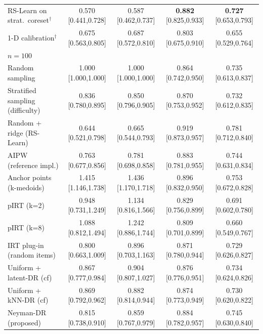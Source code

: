 \begin{tabular}{l cccc}
RS-Learn on strat.\ coreset$^\dagger$ & 0.570 {\scriptsize[0.441,0.728]} & 0.587 {\scriptsize[0.462,0.737]} & \textbf{0.882} {\scriptsize[0.825,0.933]} & \textbf{0.727} {\scriptsize[0.653,0.793]} \\
1-D calibration$^\dagger$ & 0.675 {\scriptsize[0.563,0.805]} & 0.687 {\scriptsize[0.572,0.810]} & 0.803 {\scriptsize[0.675,0.910]} & 0.655 {\scriptsize[0.529,0.764]} \\
\midrule
\multicolumn{5}{l}{\emph{$n=100$}}\\
Random sampling & 1.000 {\scriptsize[1.000,1.000]} & 1.000 {\scriptsize[1.000,1.000]} & 0.864 {\scriptsize[0.742,0.950]} & 0.735 {\scriptsize[0.613,0.837]} \\
Stratified sampling (difficulty) & 0.836 {\scriptsize[0.780,0.895]} & 0.850 {\scriptsize[0.796,0.905]} & 0.870 {\scriptsize[0.753,0.952]} & 0.732 {\scriptsize[0.612,0.835]} \\
Random + ridge (RS-Learn) & 0.644 {\scriptsize[0.521,0.798]} & 0.665 {\scriptsize[0.544,0.793]} & 0.919 {\scriptsize[0.873,0.957]} & 0.781 {\scriptsize[0.712,0.840]} \\
AIPW (reference impl.) & 0.763 {\scriptsize[0.677,0.856]} & 0.781 {\scriptsize[0.698,0.858]} & 0.883 {\scriptsize[0.781,0.955]} & 0.744 {\scriptsize[0.631,0.834]} \\
Anchor points (k-medoids) & 1.415 {\scriptsize[1.146,1.738]} & 1.436 {\scriptsize[1.170,1.718]} & 0.896 {\scriptsize[0.832,0.950]} & 0.753 {\scriptsize[0.672,0.828]} \\
pIRT (k=2) & 0.948 {\scriptsize[0.731,1.249]} & 1.134 {\scriptsize[0.816,1.566]} & 0.829 {\scriptsize[0.756,0.899]} & 0.691 {\scriptsize[0.602,0.780]} \\
pIRT (k=8) & 1.088 {\scriptsize[0.812,1.494]} & 1.242 {\scriptsize[0.886,1.744]} & 0.809 {\scriptsize[0.701,0.899]} & 0.660 {\scriptsize[0.549,0.767]} \\
IRT plug-in (random items) & 0.800 {\scriptsize[0.663,1.009]} & 0.896 {\scriptsize[0.703,1.163]} & 0.871 {\scriptsize[0.780,0.944]} & 0.729 {\scriptsize[0.626,0.827]} \\
Uniform + latent-DR (cf) & 0.867 {\scriptsize[0.777,0.984]} & 0.904 {\scriptsize[0.807,1.027]} & 0.876 {\scriptsize[0.776,0.951]} & 0.734 {\scriptsize[0.624,0.826]} \\
Uniform + kNN-DR (cf) & 0.869 {\scriptsize[0.792,0.962]} & 0.882 {\scriptsize[0.814,0.944]} & 0.874 {\scriptsize[0.773,0.949]} & 0.730 {\scriptsize[0.620,0.822]} \\
Neyman-DR (proposed) & 0.815 {\scriptsize[0.738,0.910]} & 0.859 {\scriptsize[0.767,0.979]} & 0.884 {\scriptsize[0.782,0.957]} & 0.745 {\scriptsize[0.630,0.840]} \\

\end{tabular}
